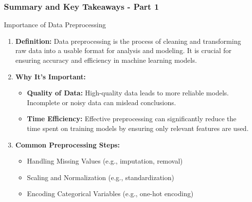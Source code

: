 \documentclass[aspectratio=169]{beamer}
\begin{document}
\begin{frame}[fragile]
    \frametitle{Summary and Key Takeaways - Part 1}
    
    \begin{block}{Importance of Data Preprocessing}
        \begin{enumerate}
            \item \textbf{Definition:} 
            Data preprocessing is the process of cleaning and transforming raw data into a usable format for analysis and modeling. It is crucial for ensuring accuracy and efficiency in machine learning models.
            
            \item \textbf{Why It's Important:}
                \begin{itemize}
                    \item \textbf{Quality of Data:} High-quality data leads to more reliable models. Incomplete or noisy data can mislead conclusions.
                    \item \textbf{Time Efficiency:} Effective preprocessing can significantly reduce the time spent on training models by ensuring only relevant features are used.
                \end{itemize}
            
            \item \textbf{Common Preprocessing Steps:}
                \begin{itemize}
                    \item Handling Missing Values (e.g., imputation, removal)
                    \item Scaling and Normalization (e.g., standardization)
                    \item Encoding Categorical Variables (e.g., one-hot encoding)
                \end{itemize}
        \end{enumerate}
    \end{block}

\end{frame}
\end{document}
